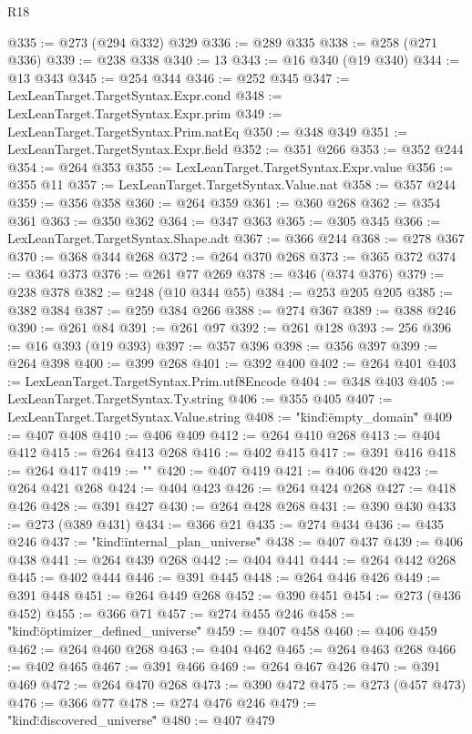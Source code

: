 \begin{lexlean}{R18}
\begin{coremodule}
{{{{{{{{{{{{{{{{{{{{{{{{{{{{{{{{{{{{{{{{{{{{{{{{{{{{{{{{{{{{{{{{{{{{{{{{{{{{{{{{{{{{{{{{{{{{{{{{{{{{{{{{{{{{{{{{{{{{{{{{{{{{@335 := @273 (@294 @332) @329
@336 := @289 @335
@338 := @258 (@271 @336)
@339 := @238 @338
@340 := 13
@343 := @16 @340 (@19 @340)
@344 := @13 @343
@345 := @254 @344
@346 := @252 @345
@347 := LexLeanTarget.TargetSyntax.Expr.cond
@348 := LexLeanTarget.TargetSyntax.Expr.prim
@349 := LexLeanTarget.TargetSyntax.Prim.natEq
@350 := @348 @349
@351 := LexLeanTarget.TargetSyntax.Expr.field
@352 := @351 @266
@353 := @352 @244
@354 := @264 @353
@355 := LexLeanTarget.TargetSyntax.Expr.value
@356 := @355 @11
@357 := LexLeanTarget.TargetSyntax.Value.nat
@358 := @357 @244
@359 := @356 @358
@360 := @264 @359
@361 := @360 @268
@362 := @354 @361
@363 := @350 @362
@364 := @347 @363
@365 := @305 @345
@366 := LexLeanTarget.TargetSyntax.Shape.adt
@367 := @366 @244
@368 := @278 @367
@370 := @368 @344 @268
@372 := @264 @370 @268
@373 := @365 @372
@374 := @364 @373
@376 := @261 @77 @269
@378 := @346 (@374 @376)
@379 := @238 @378
@382 := @248 (@10 @344 @55)
@384 := @253 @205 @205
@385 := @382 @384
@387 := @259 @384 @266
@388 := @274 @367
@389 := @388 @246
@390 := @261 @84
@391 := @261 @97
@392 := @261 @128
@393 := 256
@396 := @16 @393 (@19 @393)
@397 := @357 @396
@398 := @356 @397
@399 := @264 @398
@400 := @399 @268
@401 := @392 @400
@402 := @264 @401
@403 := LexLeanTarget.TargetSyntax.Prim.utf8Encode
@404 := @348 @403
@405 := LexLeanTarget.TargetSyntax.Ty.string
@406 := @355 @405
@407 := LexLeanTarget.TargetSyntax.Value.string
@408 := "{\"kind\":\"empty_domain\""
@409 := @407 @408
@410 := @406 @409
@412 := @264 @410 @268
@413 := @404 @412
@415 := @264 @413 @268
@416 := @402 @415
@417 := @391 @416
@418 := @264 @417
@419 := "}"
@420 := @407 @419
@421 := @406 @420
@423 := @264 @421 @268
@424 := @404 @423
@426 := @264 @424 @268
@427 := @418 @426
@428 := @391 @427
@430 := @264 @428 @268
@431 := @390 @430
@433 := @273 (@389 @431)
@434 := @366 @21
@435 := @274 @434
@436 := @435 @246
@437 := "{\"kind\":\"internal_plan_universe\""
@438 := @407 @437
@439 := @406 @438
@441 := @264 @439 @268
@442 := @404 @441
@444 := @264 @442 @268
@445 := @402 @444
@446 := @391 @445
@448 := @264 @446 @426
@449 := @391 @448
@451 := @264 @449 @268
@452 := @390 @451
@454 := @273 (@436 @452)
@455 := @366 @71
@457 := @274 @455 @246
@458 := "{\"kind\":\"optimizer_defined_universe\""
@459 := @407 @458
@460 := @406 @459
@462 := @264 @460 @268
@463 := @404 @462
@465 := @264 @463 @268
@466 := @402 @465
@467 := @391 @466
@469 := @264 @467 @426
@470 := @391 @469
@472 := @264 @470 @268
@473 := @390 @472
@475 := @273 (@457 @473)
@476 := @366 @77
@478 := @274 @476 @246
@479 := "{\"kind\":\"discovered_universe\""
@480 := @407 @479
}}}}}}}}}}}}}}}}}}}}}}}}}}}}}}}}}}}}}}}}}}}}}}}}}}}}}}}}}}}}}}}}}}}}}}}}}}}}}}}}}}}}}}}}}}}}}}}}}}}}}}}}}}}}}}}}}}}}}}}}}}}}}}}
\end{coremodule}
\end{lexlean}
